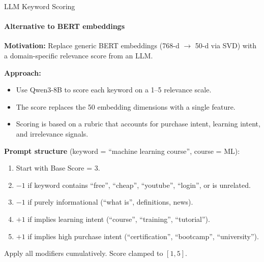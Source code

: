 \documentclass[smaller]{beamer}
\begin{document}
\begin{frame}{LLM Keyword Scoring}
\framesubtitle{Alternative to BERT embeddings}

\textbf{Motivation:} Replace generic BERT embeddings (768-d $\to$ 50-d via SVD) with a domain-specific relevance score from an LLM.

\medskip
\textbf{Approach:}
\begin{itemize}
    \item Use Qwen3-8B to score each keyword on a 1--5 relevance scale.
    \item The score replaces the 50 embedding dimensions with a single feature.
    \item Scoring is based on a rubric that accounts for purchase intent, learning intent, and irrelevance signals.
\end{itemize}

\medskip
\textbf{Prompt structure} (keyword = ``machine learning course'', course = ML):
\begin{enumerate}
    \item Start with Base Score = 3.
    \item $-1$ if keyword contains ``free'', ``cheap'', ``youtube'', ``login'', or is unrelated.
    \item $-1$ if purely informational (``what is'', definitions, news).
    \item $+1$ if implies learning intent (``course'', ``training'', ``tutorial'').
    \item $+1$ if implies high purchase intent (``certification'', ``bootcamp'', ``university'').
\end{enumerate}
Apply all modifiers cumulatively. Score clamped to $[1, 5]$.

\end{frame}
\end{document}
